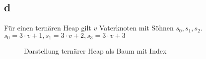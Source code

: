\documentclass{article}
\begin{document}
\subsection*{d}
Für einen ternären Heap gilt $v$ Vaterknoten mit Söhnen $s_0,s_1,s_2$.\\
$s_0 = 3\cdot v + 1, s_1 = 3\cdot v+2, s_3=3\cdot v+3$
\begin{figure}[h!]
    \caption{Darstellung ternärer Heap als Baum mit Index}
\end{figure}
\end{document}
